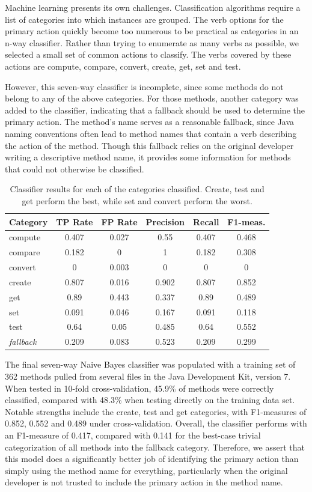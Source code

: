 \documentclass[preprint]{sigplanconf}
\begin{document}
Machine learning presents its own challenges. Classification algorithms require a list of categories into which instances are grouped. The verb options for the primary action quickly become too numerous to be practical as categories in an n-way classifier. Rather than trying to enumerate as many verbs as possible, we selected a small set of common actions to classify. The verbs covered by these actions are compute, compare, convert, create, get, set and test.

However, this seven-way classifier is incomplete, since some methods do not belong to any of the above categories. For those methods, another category was added to the classifier, indicating that a fallback should be used to determine the primary action. The method's name serves as a reasonable fallback, since Java naming conventions often lead to method names that contain a verb describing the action of the method. Though this fallback relies on the original developer writing a descriptive method name, it provides some information for methods that could not otherwise be classified.

\begin{table}
	\begin{center}
		\begin{tabular}{ l | c | c | c | c | c }
		Category & TP Rate & FP Rate & Precision & Recall & F1-meas. \\
		\hline
		compute & 0.407 & 0.027 & 0.55 & 0.407 & 0.468 \\
		compare & 0.182 & 0 & 1 & 0.182 & 0.308 \\
		convert & 0 & 0.003 & 0 & 0 & 0 \\
		create & 0.807 & 0.016 & 0.902 & 0.807 & 0.852 \\
		get & 0.89 & 0.443 & 0.337 & 0.89 & 0.489 \\
		set & 0.091 & 0.046 & 0.167 & 0.091 & 0.118 \\
		test & 0.64 & 0.05 & 0.485 & 0.64 & 0.552 \\
		\emph{fallback} & 0.209 & 0.083 & 0.523 & 0.209 & 0.299
		\end{tabular}
	\end{center}
	\caption{Classifier results for each of the categories classified. Create, test and get perform the best, while set and convert perform the worst.}
	\label{table-classifier}
\end{table}

The final seven-way Naive Bayes classifier was populated with a training set of 362 methods pulled from several files in the Java Development Kit, version 7. When tested in 10-fold cross-validation, 45.9\% of methods were correctly classified, compared with 48.3\% when testing directly on the training data set. Notable strengths include the create, test and get categories, with F1-measures of 0.852, 0.552 and 0.489 under cross-validation. Overall, the classifier performs with an F1-measure of 0.417, compared with 0.141 for the best-case trivial categorization of all methods into the fallback category. Therefore, we assert that this model does a significantly better job of identifying the primary action than simply using the method name for everything, particularly when the original developer is not trusted to include the primary action in the method name.
\end{document}
